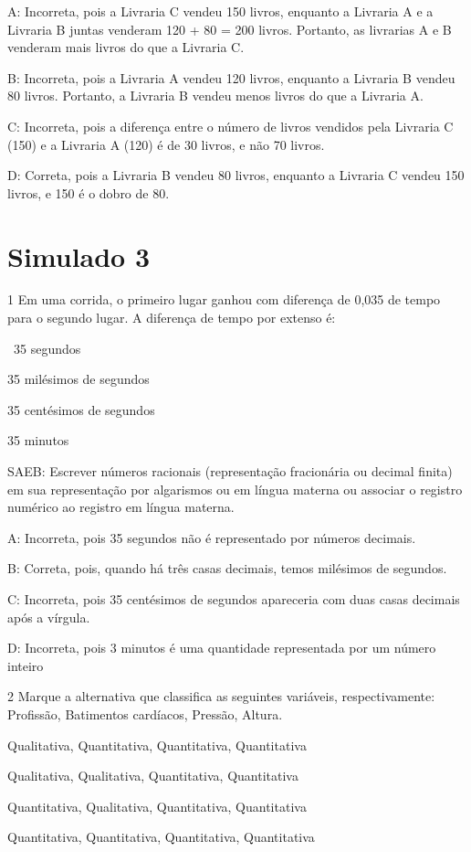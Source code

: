 {A: Incorreta, pois a Livraria C vendeu 150 livros, enquanto a Livraria A
e a Livraria B juntas venderam 120 + 80 = 200 livros. Portanto, as
livrarias A e B venderam mais livros do que a Livraria C.

B: Incorreta, pois a Livraria A vendeu 120 livros, enquanto a Livraria B
vendeu 80 livros. Portanto, a Livraria B vendeu menos livros do que a
Livraria A.

C: Incorreta, pois a diferença entre o número de livros vendidos pela
Livraria C (150) e a Livraria A (120) é de 30 livros, e não 70 livros.

D: Correta, pois a Livraria B vendeu 80 livros, enquanto a Livraria C
vendeu 150 livros, e 150 é o dobro de 80.


\section*{Simulado 3}

\num{1} Em uma corrida, o primeiro lugar ganhou com diferença de 0,035 de
tempo para o segundo lugar. A diferença de tempo por extenso é:
\item~35 segundos
\item 35 milésimos de segundos
\item 35 centésimos de segundos~
\item 35 minutos

SAEB: Escrever números racionais (representação fracionária ou decimal
finita) em sua representação por algarismos ou em língua materna ou
associar o registro numérico ao registro em língua materna.

A: Incorreta, pois 35 segundos não é representado por números decimais.

B: Correta, pois, quando há três casas decimais, temos milésimos de
segundos.

C: Incorreta, pois 35 centésimos de segundos apareceria com duas casas
decimais após a vírgula.

D: Incorreta, pois 3 minutos é uma quantidade representada por um número
inteiro

\num{2} Marque a alternativa que classifica as seguintes variáveis,
respectivamente: Profissão, Batimentos cardíacos, Pressão, Altura.
\item Qualitativa, Quantitativa, Quantitativa, Quantitativa
\item Qualitativa, Qualitativa, Quantitativa, Quantitativa
\item Quantitativa, Qualitativa, Quantitativa, Quantitativa
\item Quantitativa, Quantitativa, Quantitativa, Quantitativa

}
